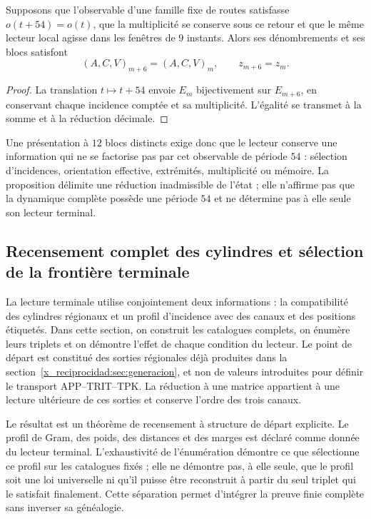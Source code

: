 \begin{proposition}
Supposons que l'observable d'une famille fixe de routes satisfasse
\(o(t+54)=o(t)\), que la multiplicité se conserve sous ce retour
et que le même lecteur local agisse dans les fenêtres de \(9\) instants.
Alors ses dénombrements et ses blocs satisfont
\[
 (A,C,V)_{m+6}=(A,C,V)_m,\qquad z_{m+6}=z_m.
\]
\end{proposition}

\begin{proof}
La translation \(t\mapsto t+54\) envoie \(E_m\) bijectivement
sur \(E_{m+6}\), en conservant chaque incidence comptée et sa multiplicité.
L'égalité se transmet à la somme et à la réduction décimale.
\end{proof}

Une présentation à \(12\) blocs distincts exige donc que
le lecteur conserve une information qui ne se factorise pas par cet observable
de période \(54\) : sélection d'incidences, orientation effective,
extrémités, multiplicité ou mémoire. La proposition délimite une réduction
inadmissible de l'état ; elle n'affirme pas que la dynamique complète possède une
période \(54\) et ne détermine pas à elle seule son lecteur terminal.



\subsection{Recensement complet des cylindres et sélection de la frontière terminale}
\label{x_reciprocidad:censo:terminal-completo}

La lecture terminale utilise conjointement deux informations : la compatibilité des cylindres régionaux et un profil d'incidence avec des canaux et des positions étiquetés. Dans cette section, on construit les catalogues complets, on énumère leurs triplets et on démontre l'effet de chaque condition du lecteur. Le point de départ est constitué des sorties régionales déjà produites dans la section~\ref{x_reciprocidad:sec:generacion}, et non de valeurs introduites pour définir le transport APP--TRIT--TPK. La réduction à une matrice appartient à une lecture ultérieure de ces sorties et conserve l'ordre des trois canaux.

Le résultat est un théorème de recensement à structure de départ explicite.
Le profil de Gram, des poids, des distances et des marges est déclaré comme donnée du
lecteur terminal. L'exhaustivité de l'énumération démontre ce que sélectionne
ce profil sur les catalogues fixés ; elle ne démontre pas, à elle seule, que le
profil soit une loi universelle ni qu'il puisse être reconstruit à partir du seul triplet
qui le satisfait finalement. Cette séparation permet d'intégrer la preuve
finie complète sans inverser sa généalogie.

